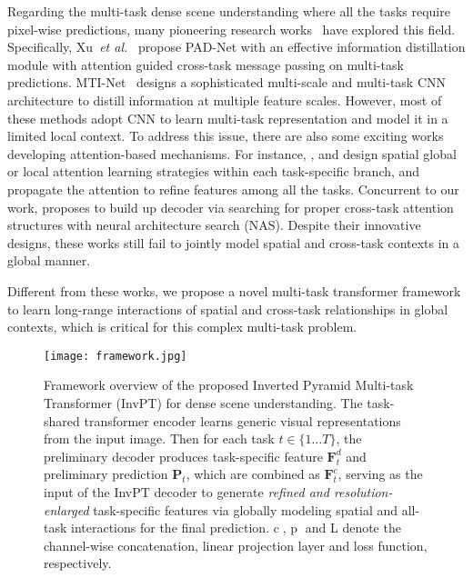 \documentclass[runningheads]{llncs}
\begin{document}
\par Regarding the multi-task dense scene understanding where all the tasks require pixel-wise predictions, many pioneering research works~\cite{kendall2018multi,astmt,crossstitch,nddr,padnet} have explored this field. Specifically, Xu~\textit{et al.}~\cite{padnet} propose PAD-Net with an effective information distillation module with attention guided cross-task message passing on multi-task predictions. MTI-Net~\cite{mti} designs a sophisticated  multi-scale and multi-task CNN architecture to distill information at multiple feature scales.
However, most of these methods adopt CNN to learn multi-task representation and model it in a limited local context.
To address this issue, there are also some exciting works developing attention-based mechanisms. For instance, \cite{papnet}, \cite{psd} and \cite{zhang2021transfer}
design spatial global or local attention learning strategies within each task-specific branch, and propagate the attention to refine features among all the tasks.
Concurrent to our work, \cite{atrc} proposes to build up decoder via searching for proper cross-task attention structures with neural architecture search (NAS). Despite their innovative designs, these works still fail to jointly model spatial and cross-task contexts in a global manner.

\par Different from these works, we propose a novel multi-task transformer framework to learn long-range interactions of spatial and cross-task relationships in global contexts, which is critical for this complex multi-task problem.
\begin{figure*}[!t]
	\centering
	\texttt{[image: framework.jpg]}
\vspace{-18pt}
\caption{Framework overview of the proposed Inverted Pyramid Multi-task Transformer (InvPT) for dense scene understanding.
The task-shared transformer encoder learns generic visual representations from the input image. Then for each task $t\in\{ 1\dots T\}$, the preliminary decoder produces task-specific feature $\mathbf{F}^d_t$ and preliminary prediction $\mathbf{P}_t$, which are combined as $\mathbf{F}^c_t$, serving as the input of the InvPT decoder to generate \emph{refined and resolution-enlarged} task-specific features via globally modeling spatial and all-task interactions for the final prediction. \textcircled{c},  \textcircled{p} and L denote the channel-wise concatenation, linear projection layer and loss function, respectively.}
\vspace{-22pt}
\label{fig:framework}
\end{figure*}
\end{document}
